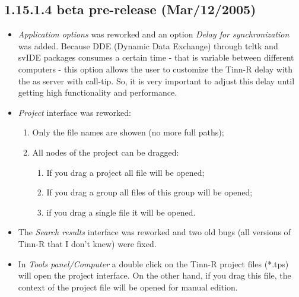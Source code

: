 \subsection*{1.15.1.4 beta pre-release (Mar/12/2005)}
\begin{itemize}
  \item \textit{Application options} was reworked and an option \textit{Delay for synchronization} was added.
    Because DDE (Dynamic Data Exchange) through tcltk and svIDE packages consumes a certain time - that is
    variable between different computers - this option allows the user to customize the Tinn-R delay with the
    \RR{} as server with call-tip.
    So, it is very important to adjust this delay until getting high functionality and performance.
  \item \textit{Project} interface was reworked:
    \begin{enumerate}
      \item Only the file names are showen (no more full paths);
      \item All nodes of the project can be dragged:
        \begin{enumerate}
          \item If you drag a project all file will be opened;
          \item If you drag a group all files of this group will be opened;
          \item if you drag a single file it will be opened.
        \end{enumerate}
    \end{enumerate}
  \item The \textit{Search results} interface was reworked and two old bugs (all versions of Tinn-R that I don't knew)
    were fixed.
  \item In \textit{Tools panel/Computer} a double click on the Tinn-R project files (*.tps) will open the project
    interface. On the other hand, if you drag this file, the context of the project file will be opened
    for manual edition.
\end{itemize}


